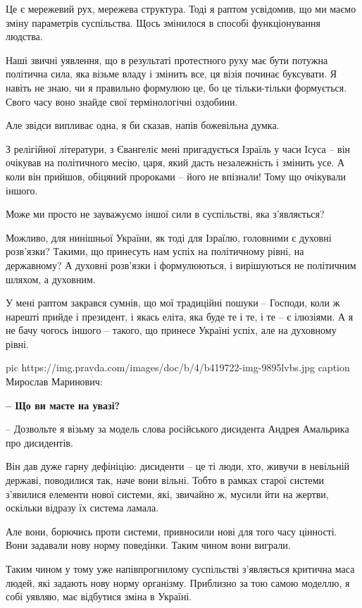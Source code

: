 Це є мережевий рух, мережева структура. Тоді я раптом усвідомив, що ми маємо
зміну параметрів суспільства. Щось змінилося в способі функціонування людства. 

Наші звичні уявлення, що в результаті протестного руху має бути потужна
політична сила, яка візьме владу і змінить все, ця візія починає буксувати. Я
навіть не знаю, чи я правильно формулюю це, бо це тільки-тільки формується.
Свого часу воно знайде свої термінологічні оздобини.

Але звідси випливає одна, я би сказав, напів божевільна думка. 

З релігійної літератури, з Євангеліє мені пригадується Ізраїль у часи Ісуса –
він очікував на політичного месію, царя, який дасть незалежність і змінить усе.
А коли він прийшов, обіцяний пророками – його не впізнали! Тому що очікували
іншого. 

Може ми просто не зауважуємо іншої сили в суспільстві, яка з’являється?  

Можливо, для нинішньої України, як тоді для Ізраїлю, головними є духовні
розв’язки? Такими, що принесуть нам успіх на політичному рівні, на державному?
А духовні розв’язки і формулюються, і вирішуються не політичним шляхом, а
духовним. 

У мені раптом закрався сумнів, що мої традиційні пошуки – Господи, коли ж
нарешті прийде і президент, і якась еліта, яка буде те і те, і те – є ілюзіями.
А я не бачу чогось іншого – такого, що принесе Україні успіх, але на духовному
рівні.

\ifcmt
pic https://img.pravda.com/images/doc/b/4/b419722-img-9895lvbs.jpg
caption Мирослав Маринович: 
\fi

{\bfseries 
– Що ви маєте на увазі?
}

– Дозвольте я візьму за модель слова російського дисидента Андрея Амальрика про
дисидентів.

Він дав дуже гарну дефініцію: дисиденти – це ті люди, хто, живучи в невільній
державі, поводилися так, наче вони вільні. Тобто в рамках старої системи
з’явилися елементи нової системи, які, звичайно ж, мусили йти на жертви,
оскільки відразу їх система ламала. 

Але вони, борючись проти системи, привносили нові для того часу цінності. Вони
задавали нову норму поведінки. Таким чином вони виграли. 

Таким чином у тому уже напівпрогнилому суспільстві з’являється критична маса
людей, які задають нову норму організму. Приблизно за тою самою моделлю, я собі
уявляю, має відбутися зміна в Україні. 


